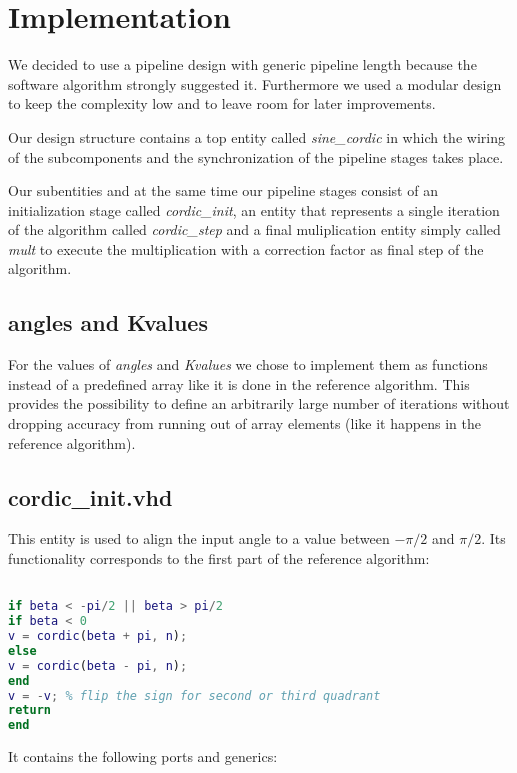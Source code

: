 \section{Implementation}
We decided to use a pipeline design with generic pipeline length because the software algorithm strongly suggested it. Furthermore we used a modular design to keep the complexity low and to leave room for later improvements.

Our design structure contains a top entity called \textit{sine\_cordic} in which the wiring of the subcomponents and the synchronization of the pipeline stages takes place.

Our subentities and at the same time our pipeline stages consist of an initialization stage called \textit{cordic\_init}, an entity that represents a single iteration of the algorithm called \textit{cordic\_step} and a final muliplication entity simply called \textit{mult} to execute the multiplication with a correction factor as final step of the algorithm. 

\subsection{angles and Kvalues}

For the values of \textit{angles} and \textit{Kvalues} we chose to implement them as functions
instead of a predefined array like it is done in the reference algorithm. This provides the possibility to define an arbitrarily large number of iterations without dropping accuracy from running out of array elements (like it happens in the reference algorithm).

\subsection{cordic\_init.vhd}

This entity is used to align the input angle to a value between \(-\pi/2\) and \(\pi/2\). Its functionality corresponds to the first part of the reference algorithm:

\begin{lstlisting}[language=Matlab]

if beta < -pi/2 || beta > pi/2
if beta < 0
v = cordic(beta + pi, n);
else
v = cordic(beta - pi, n);
end
v = -v; % flip the sign for second or third quadrant
return
end

\end{lstlisting}

It contains the following ports and generics: 

